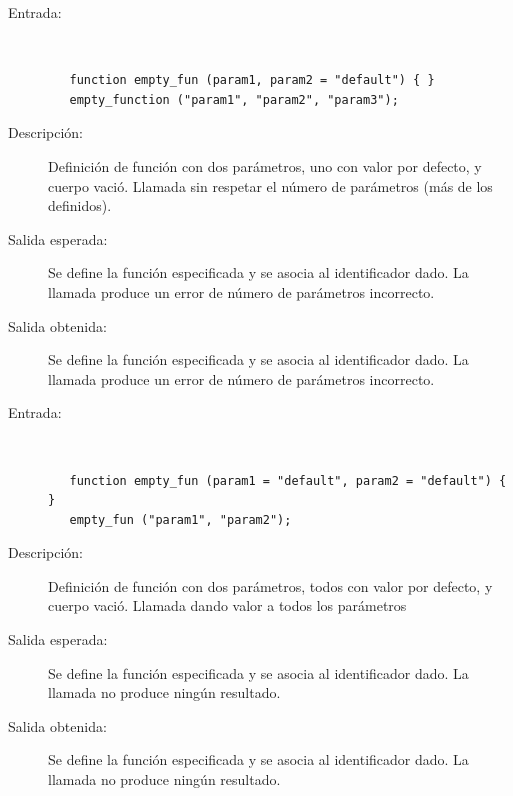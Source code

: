 \begin{framed}
	\begin{description}
		\item [Entrada:] \hfill \\
\begin{lstlisting}
   function empty_fun (param1, param2 = "default") { } 
   empty_function ("param1", "param2", "param3");
\end{lstlisting}
		\item [Descripción:] Definición de función con dos parámetros, uno con valor por defecto, y cuerpo vació. Llamada sin respetar el número de parámetros (más de los definidos). 
		\item [Salida esperada:] Se define la función especificada y se asocia al identificador dado. La llamada produce un error de número de parámetros incorrecto.
		\item [Salida obtenida:] Se define la función especificada y se asocia al identificador dado. La llamada produce un error de número de parámetros incorrecto.
	\end{description}
\end{framed}

\begin{framed}
	\begin{description}
		\item [Entrada:] \hfill \\
\begin{lstlisting}
   function empty_fun (param1 = "default", param2 = "default") { } 
   empty_fun ("param1", "param2");
\end{lstlisting}
		\item [Descripción:] Definición de función con dos parámetros, todos con valor por defecto, y cuerpo vació. Llamada dando valor a todos los parámetros
		\item [Salida esperada:] Se define la función especificada y se asocia al identificador dado. La llamada no produce ningún resultado.
		\item [Salida obtenida:] Se define la función especificada y se asocia al identificador dado. La llamada no produce ningún resultado.
	\end{description}
\end{framed}

